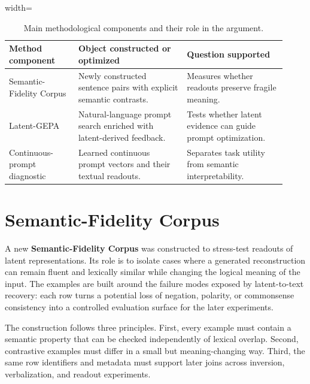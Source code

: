 \documentclass[12pt,a4paper,twoside,openright]{book}
\begin{document}
\begin{table}[!htb]
    \centering
    \small
    \begin{adjustbox}{width=\textwidth}
    \begin{tabular}{p{0.23\linewidth} p{0.36\linewidth} p{0.33\linewidth}}
        \toprule
        \textbf{Method component} & \textbf{Object constructed or optimized} & \textbf{Question supported} \\
        \midrule
        Semantic-Fidelity Corpus &
        Newly constructed sentence pairs with explicit semantic contrasts. &
        Measures whether readouts preserve fragile meaning. \\
        Latent-GEPA &
        Natural-language prompt search enriched with latent-derived feedback. &
        Tests whether latent evidence can guide prompt optimization. \\
        Continuous-prompt diagnostic &
        Learned continuous prompt vectors and their textual readouts. &
        Separates task utility from semantic interpretability. \\
        \bottomrule
    \end{tabular}
    \end{adjustbox}
    \caption{Main methodological components and their role in the argument.}
    \label{tab:method-components}
\end{table}

\section{Semantic-Fidelity Corpus}
\label{sec:method-semantic-fidelity-corpus}

A new \textbf{Semantic-Fidelity Corpus} was constructed to stress-test readouts
of latent representations. Its role is to isolate cases where a generated
reconstruction can remain fluent and lexically similar while changing the
logical meaning of the input. The examples are built around the failure modes
exposed by latent-to-text recovery: each row turns a potential loss of negation,
polarity, or commonsense consistency into a controlled evaluation surface for
the later experiments.

The construction follows three principles. First, every example must contain a
semantic property that can be checked independently of lexical overlap. Second,
contrastive examples must differ in a small but meaning-changing way. Third, the
same row identifiers and metadata must support later joins across inversion,
verbalization, and readout experiments.
\end{document}
